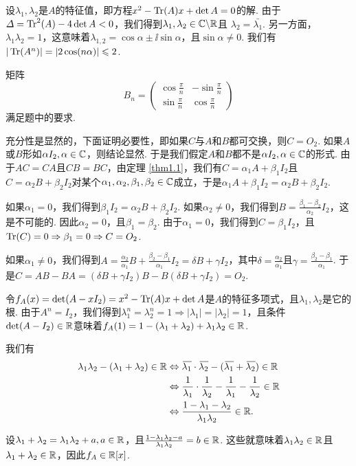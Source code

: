 \begin{solution}
  设$\lambda_1,\lambda_2$是$A$的特征值，即方程$x^2-\operatorname{Tr}(A)x+\det A=0$的解. 由于$\varDelta=\operatorname{Tr}^2(A)-4\det A<0$，我们得到$\lambda_1,\lambda_2\in\mathbb C\backslash\mathbb R$且
  $\lambda_2=\bar{\lambda_1}$. 另一方面，$\lambda_1\lambda_2=1$，这意味着$\lambda_{1,2}=
  \cos\alpha\pm\ii\sin\alpha$，且$\sin\alpha\ne0$. 我们有$|\operatorname{Tr}(A^n)|=|2\cos(n\alpha)|\leqslant2$.

  矩阵
  \[
    B_n = \begin{pmatrix}
      \cos\frac\pi n & - \sin\frac\pi n\\
      \sin\frac\pi n & \cos \frac\pi n
    \end{pmatrix}
  \]
  满足题中的要求.
\end{solution}

\begin{solution}
  充分性是显然的，下面证明必要性，即如果$C$与$A$和$B$都可交换，则$C=O_2$. 如果$A$或$B$形如$\alpha I_2,\alpha\in\mathbb C$，则结论显然. 于是我们假定$A$和$B$都不是$\alpha I_2,\alpha\in\mathbb C$的形式. 由于$AC=CA$且$CB=BC$，由定理 \ref{thm1.1}，我们有$C=\alpha_1A+\beta_1I_2$且$C=\alpha_2B+\beta_2I_2$对某个$\alpha_1,\alpha_2,\beta_1,\beta_2\in\mathbb C$成立，于是$\alpha_1A+\beta_1I_2=\alpha_2B+\beta_2I_2$.

  如果$\alpha_1=0$，我们得到$\beta_1I_2=\alpha_2B+\beta_2I_2$. 如果$\alpha_2\ne0$，我们得到$B=\frac{\beta_1-\beta_2}{\alpha_2}I_2$，这是不可能的. 因此$\alpha_2=0$，且$\beta_1=\beta_2$. 由于$\alpha_1=0$，我们得到$C=\beta_1I_2$，且$\operatorname{Tr}(C)=0\Rightarrow\beta_1=0
  \Rightarrow C=O_2 $.

  如果$\alpha_1\ne0$，我们得到$A=\frac{\alpha_2}{\alpha_1}B+\frac{\beta_2-\beta_1}{\alpha_1}I_2=\delta B+\gamma I_2$，其中$\delta=\frac{\alpha_2}{\alpha_1}$且$\gamma=\frac{\beta_2-\beta_1}{\alpha_1}$. 于是$C=AB-BA=(\delta B+\gamma I_2)B-B(\delta B+\gamma I_2)=O_2$.
\end{solution}

\begin{solution}
  令$f_A(x)=\det(A-xI_2)=x^2-\operatorname{Tr}(A)x+\det A$是$A$的特征多项式，且$\lambda_1,\lambda_2$是它的根. 由于$A^n=I_2$，我们得到$\lambda_1^n=\lambda_2^n=1\Rightarrow
  |\lambda_1|=|\lambda_2|=1$，且条件$\det(A-I_2)\in\mathbb R$意味着$f_A(1)=1-(\lambda_1+\lambda_2)+\lambda_1\lambda_2\in\mathbb R$.

  我们有
  \begin{align*}
    \lambda_1\lambda_2 - (\lambda_1 + \lambda_2)
    \in \mathbb R & \Leftrightarrow {}\mkern2mu\overline{\mkern-2mu\lambda_1}\cdot{}\mkern2mu\overline{\mkern-2mu\lambda_2} - ({}\mkern2mu\overline{\mkern-2mu\lambda_1} + {}\mkern2mu\overline{\mkern-2mu\lambda_2}) \in \mathbb R \\
    & \Leftrightarrow \frac1{\lambda_1}\cdot\frac1{\lambda_2} - \frac1{\lambda_1} - \frac1{\lambda_2} \in \mathbb R \\
    & \Leftrightarrow \frac{1-\lambda_1-\lambda_2}{\lambda_1\lambda_2} \in \mathbb R.
  \end{align*}

  设$\lambda_1+\lambda_2=\lambda_1\lambda_2+a,a\in\mathbb R$，且$\frac{1-\lambda_1\lambda_2-a}{\lambda_1\lambda_2}
  =b\in\mathbb R$. 这些就意味着$\lambda_1\lambda_2\in\mathbb R$且$\lambda_1+\lambda_2\in\mathbb R$，因此$f_A\in\mathbb R[x]$.
\end{solution}

